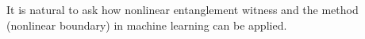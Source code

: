 \documentclass[
reprint,
aps,
pra,
]{revtex4-2}
\theoremstyle{plain}
\theoremstyle{definition}
\newtheorem{remark}{Remark}
\begin{document}


It is natural to ask how nonlinear entanglement witness \cite{guhneNonlinearEntanglementWitnesses2006}  and the  method (nonlinear boundary) in machine learning can be applied. 

\end{document}
